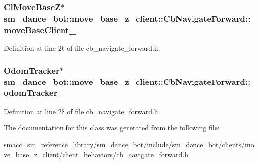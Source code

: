 \subsubsection[{\texorpdfstring{move\+Base\+Client\+\_\+}{moveBaseClient_}}]{\setlength{\rightskip}{0pt plus 5cm}Cl\+Move\+BaseZ$\ast$ sm\+\_\+dance\+\_\+bot\+::move\+\_\+base\+\_\+z\+\_\+client\+::\+Cb\+Navigate\+Forward\+::move\+Base\+Client\+\_\+}\hypertarget{classsm__dance__bot_1_1move__base__z__client_1_1CbNavigateForward_a75d6a72a4ac20fb718723fc9f98efae2}{}\label{classsm__dance__bot_1_1move__base__z__client_1_1CbNavigateForward_a75d6a72a4ac20fb718723fc9f98efae2}


Definition at line 26 of file cb\+\_\+navigate\+\_\+forward.\+h.

\subsubsection[{\texorpdfstring{odom\+Tracker\+\_\+}{odomTracker_}}]{\setlength{\rightskip}{0pt plus 5cm}Odom\+Tracker$\ast$ sm\+\_\+dance\+\_\+bot\+::move\+\_\+base\+\_\+z\+\_\+client\+::\+Cb\+Navigate\+Forward\+::odom\+Tracker\+\_\+}\hypertarget{classsm__dance__bot_1_1move__base__z__client_1_1CbNavigateForward_ad383206447b313d604e6645041a6cfc4}{}\label{classsm__dance__bot_1_1move__base__z__client_1_1CbNavigateForward_ad383206447b313d604e6645041a6cfc4}


Definition at line 28 of file cb\+\_\+navigate\+\_\+forward.\+h.



The documentation for this class was generated from the following file\+:\begin{DoxyCompactItemize}
\item 
smacc\+\_\+sm\+\_\+reference\+\_\+library/sm\+\_\+dance\+\_\+bot/include/sm\+\_\+dance\+\_\+bot/clients/move\+\_\+base\+\_\+z\+\_\+client/client\+\_\+behaviors/\hyperlink{smacc__sm__reference__library_2sm__dance__bot_2include_2sm__dance__bot_2clients_2move__base__z__af7739851e4ad3a8f288f51062fe894a}{cb\+\_\+navigate\+\_\+forward.\+h}\end{DoxyCompactItemize}

